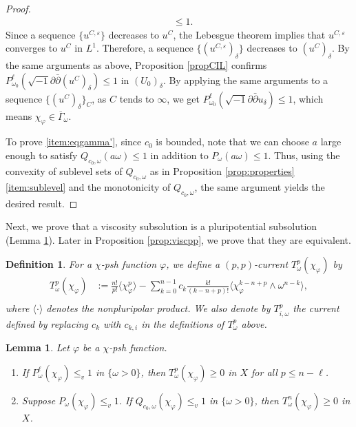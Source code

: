 \documentclass[10pt,a4paper]{amsart}
\numberwithin{equation}{section}
\newtheorem{lem}[equation]{Lemma}
\newtheorem{defn}[equation]{Definition}
\newcommand{\delb}{\sqrt{-1}\partial\bar{\partial}}
\begin{document}
\begin{proof}
\begin{equation}
\begin{aligned}
        &\le 1.
        \end{aligned}
        \end{equation}
        Since a sequence $\{u^{C,\varepsilon}\}$ decreases to $u^C$, the Lebesgue theorem implies that $u^{C,\varepsilon}$ converges to $u^C$ in $L^1$. Therefore, a sequence $\{(u^{C,\varepsilon})_\delta\}$ decreases to $(u^C)_\delta$. By the same arguments as above, Proposition \ref{propCIL} confirms $P^\ell_{\omega_0}(\delb(u^C)_\delta) \le 1$ in $(U_0)_\delta$. By applying the same arguments to a sequence $\{(u^C)_\delta\}_C$, as $C$ tends to $\infty$, we get $P^\ell_{\omega_0}(\delb u_\delta)\le 1$, which means $\chi_\varphi\in \overline{\Gamma}_\omega$.

        To prove \ref{item:eqgamma'}, since $c_0$ is bounded, note that we can choose $a$ large enough to satisfy $Q_{c_0,\omega}(a\omega)\le1$ in addition to $P_\omega(a\omega)\le1$. Thus, using the convexity of sublevel sets of $Q_{c_0,\omega}$ as in Proposition \ref{prop:properties} \ref{item:sublevel} and the monotonicity of $Q_{c_0,\omega}$, the same argument yields the desired result.
    \end{proof}

Next, we prove that a viscosity subsolution is a pluripotential subsolution (Lemma \ref{lem:visctopp}). Later in Proposition \ref{prop:viscpp}, we prove that they are equivalent.

\begin{defn}\label{def:llcurrent}
    For a $\chi$-psh function $\varphi$, we define a $(p,p)$-current $T^p_\omega(\chi_\varphi)$ by
    \begin{align*}
        T^p_\omega(\chi_\varphi)&:=\frac{n!}{p!}\langle\chi_\varphi^p\rangle-\sum_{k=0}^{n-1}c_k\frac{k!}{(k-n+p)!}\langle\chi_\varphi^{k-n+p}\wedge\omega^{n-k}\rangle,\\
    \end{align*}
    where $\langle\cdot\rangle$ denotes the nonpluripolar product.
    We also denote by $T^p_{i,\omega}$ the current defined by replacing $c_k$ with $c_{k,i}$ in the definitions of $T^p_\omega$ above.
\end{defn}

\begin{lem}\label{lem:visctopp}
    Let $\varphi$ be a $\chi$-psh function.
    \begin{enumerate}[label={\upshape(\roman*)}]
        \item\label{item:visctoppn-1} 
        If $P^\ell_{\omega}(\chi_\varphi)\le_v 1$ in $\{\omega>0\}$, then $T^p_\omega(\chi_\varphi)\ge0$ in $X$ for all $p\le n-\ell$.
        \item\label{item:visctoppn} 
        Suppose $P_{\omega}(\chi_\varphi)\le_v 1$. If $Q_{c_0,\omega}(\chi_\varphi)\le_v 1$ in $\{\omega>0\}$, then $T^n_\omega(\chi_\varphi)\ge0$ in $X$.
    \end{enumerate}
\end{lem}
\end{document}

